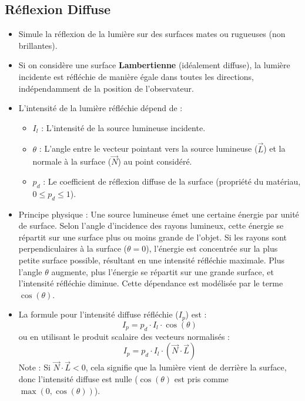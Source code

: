 \documentclass{article}
\begin{document}
\subsection{Réflexion Diffuse}
\begin{itemize}
    \item Simule la réflexion de la lumière sur des surfaces mates ou rugueuses (non brillantes).
    \item Si on considère une surface \textbf{Lambertienne} (idéalement diffuse), la lumière incidente est réfléchie de manière égale dans toutes les directions, indépendamment de la position de l'observateur.
    \item L'intensité de la lumière réfléchie dépend de :
        \begin{itemize}
            \item $I_l$ : L'intensité de la source lumineuse incidente.
            \item $\theta$ : L'angle entre le vecteur pointant vers la source lumineuse ($\vec{L}$) et la normale à la surface ($\vec{N}$) au point considéré.
            \item $p_d$ : Le coefficient de réflexion diffuse de la surface (propriété du matériau, $0 \le p_d \le 1$).
        \end{itemize}
    \item Principe physique : Une source lumineuse émet une certaine énergie par unité de surface. Selon l'angle d'incidence des rayons lumineux, cette énergie se répartit sur une surface plus ou moins grande de l'objet. Si les rayons sont perpendiculaires à la surface ($\theta = 0$), l'énergie est concentrée sur la plus petite surface possible, résultant en une intensité réfléchie maximale. Plus l'angle $\theta$ augmente, plus l'énergie se répartit sur une grande surface, et l'intensité réfléchie diminue. Cette dépendance est modélisée par le terme $\cos(\theta)$.
    \item La formule pour l'intensité diffuse réfléchie ($I_p$) est :
      \[ I_p = p_d \cdot I_l \cdot \cos(\theta) \]
      ou en utilisant le produit scalaire des vecteurs normalisés :
      \[ I_p = p_d \cdot I_l \cdot (\vec{N} \cdot \vec{L}) \]
      Note : Si $\vec{N} \cdot \vec{L} < 0$, cela signifie que la lumière vient de derrière la surface, donc l'intensité diffuse est nulle ($\cos(\theta)$ est pris comme $\max(0, \cos(\theta))$).
\end{itemize}
\end{document}
